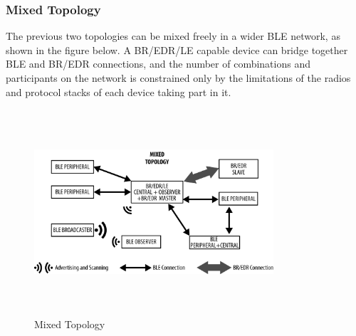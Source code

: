 \subsubsection{Mixed Topology}
The previous two topologies can be mixed freely in a wider BLE network, as shown in the figure below. A BR/EDR/LE capable device can bridge together BLE and BR/EDR connections, and the number of combinations and participants on the network is constrained only by the limitations of the radios and protocol stacks of each device taking part in it.
\begin{figure}[ht]
	\centering
	\includegraphics[width=3.5in, height=3in]{images/mixed_topology.png}
	\caption{Mixed Topology}
\end{figure}
